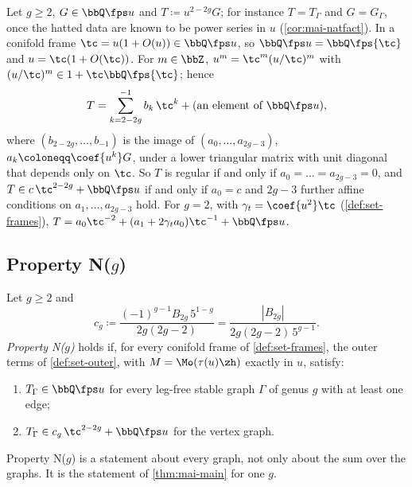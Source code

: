 \begin{rmk}
\label{rmk:set-reversion}
Let $g\geq2$, $G\in\bbQ\fps u$ and $T\coloneqq u^{2-2g}G$; for instance $T=T_\Gamma$ and $G=G_\Gamma$, once the hatted data are known to be power series in $u$ (\cref{cor:mai-natfact}). In a conifold frame $\tc=u(1+O(u))\in\bbQ\fps u$, so $\bbQ\fps u=\bbQ\fps{\tc}$ and $u=\tc(1+O(\tc))$. For $m\in\bbZ$, $u^m=\tc^m(u/\tc)^m$ with $(u/\tc)^m\in1+\tc\bbQ\fps{\tc}$; hence
\[
T=\sum_{k=2-2g}^{-1}b_k\,\tc^k+(\text{an element of }\bbQ\fps u),
\]
where $(b_{2-2g},\dots,b_{-1})$ is the image of $(a_0,\dots,a_{2g-3})$, $a_k\coloneqq\coef{u^k}G$, under a lower triangular matrix with unit diagonal that depends only on $\tc$. So $T$ is regular if and only if $a_0=\dots=a_{2g-3}=0$, and $T\in c\,\tc^{2-2g}+\bbQ\fps u$ if and only if $a_0=c$ and $2g-3$ further affine conditions on $a_1,\dots,a_{2g-3}$ hold. For $g=2$, with $\gamma_t=\coef{u^2}\tc$ (\cref{def:set-frames}), $T=a_0\tc^{-2}+(a_1+2\gamma_ta_0)\tc^{-1}+\bbQ\fps u$.
\end{rmk}

\subsection{Property N(\texorpdfstring{$g$}{g})}
\label{sec:set-N}

\begin{defn}[Property N($g$)]
\label{def:set-N}
Let $g\geq2$ and
\begin{equation}
\label{eq:set-cg}
c_g\coloneqq\frac{(-1)^{g-1}B_{2g}\,5^{1-g}}{2g(2g-2)}=\frac{|B_{2g}|}{2g(2g-2)\,5^{g-1}} .
\end{equation}
\emph{Property N($g$)} holds if, for every conifold frame of \cref{def:set-frames}, the outer terms of \cref{def:set-outer}, with $M=\Mo(\tau(u)\zh)$ exactly in $u$, satisfy:
\begin{enumerate}
\item $T_\Gamma\in\bbQ\fps u$ for every leg-free stable graph $\Gamma$ of genus $g$ with at least one edge;
\item $T_\Gamma\in c_g\,\tc^{2-2g}+\bbQ\fps u$ for the vertex graph.
\end{enumerate}
Property N($g$) is a statement about every graph, not only about the sum over the graphs. It is the statement of \cref{thm:mai-main} for one $g$.
\end{defn}

